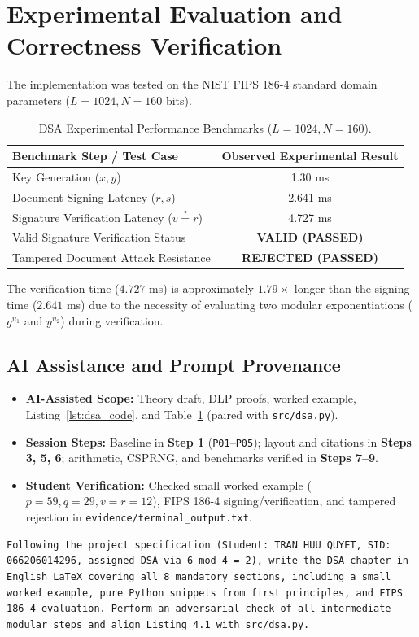 \section{Experimental Evaluation and Correctness Verification}
The implementation was tested on the NIST FIPS 186-4 standard domain parameters ($L=1024, N=160$ bits).

\begin{table}[H]
\centering
\caption{DSA Experimental Performance Benchmarks ($L=1024, N=160$).}
\label{tab:dsa_perf}
\begin{tabular}{lc}
\toprule
\textbf{Benchmark Step / Test Case} & \textbf{Observed Experimental Result} \\
\midrule
Key Generation ($x, y$) & 1.30 ms \\
Document Signing Latency ($r, s$) & 2.641 ms \\
Signature Verification Latency ($v \stackrel{?}{=} r$) & 4.727 ms \\
Valid Signature Verification Status & \textbf{VALID (PASSED)} \\
Tampered Document Attack Resistance & \textbf{REJECTED (PASSED)} \\
\bottomrule
\end{tabular}
\end{table}

The verification time ($4.727$ ms) is approximately $1.79 \times$ longer than the signing time ($2.641$ ms) due to the necessity of evaluating two modular exponentiations ($g^{u_1}$ and $y^{u_2}$) during verification.

\subsection*{AI Assistance and Prompt Provenance}
\begin{itemize}
    \item \textbf{AI-Assisted Scope:} Theory draft, DLP proofs, worked example, Listing~\ref{lst:dsa_code}, and Table~\ref{tab:dsa_perf} (paired with \texttt{src/dsa.py}).
    \item \textbf{Session Steps:} Baseline in \textbf{Step 1} (\texttt{P01}--\texttt{P05}); layout and citations in \textbf{Steps 3, 5, 6}; arithmetic, CSPRNG, and benchmarks verified in \textbf{Steps 7--9}.
    \item \textbf{Student Verification:} Checked small worked example ($p=59, q=29, v=r=12$), FIPS 186-4 signing/verification, and tampered rejection in \texttt{evidence/\allowbreak terminal\_output.txt}.
\end{itemize}
\begin{lstlisting}[style=promptstyle, caption={Compact Prompt (R-REP-04) for Chapter 4: DSA.}, label={lst:prompt_ch4}]
Following the project specification (Student: TRAN HUU QUYET, SID: 066206014296, assigned DSA via 6 mod 4 = 2), write the DSA chapter in English LaTeX covering all 8 mandatory sections, including a small worked example, pure Python snippets from first principles, and FIPS 186-4 evaluation. Perform an adversarial check of all intermediate modular steps and align Listing 4.1 with src/dsa.py.
\end{lstlisting}
